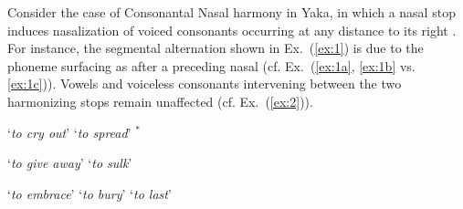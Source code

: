 \documentclass[11pt,a4paper]{article}
\begin{document}
%
%

Consider the case of Consonantal Nasal harmony in Yaka, in which a nasal stop induces nasalization of voiced consonants occurring at any distance to its right  \cite{hyman1995nasal,Walker_Yaka}.
For instance, the  segmental alternation shown in  Ex.~(\ref{ex:1}) is due to the phoneme  surfacing as  \textipa{[n]} after a preceding nasal  (cf.  Ex.~(\ref{ex:1a}, \ref{ex:1b} vs.  \ref{ex:1c})).\@
Vowels and voiceless consonants intervening between the two harmonizing stops remain unaffected  (cf. Ex.~(\ref{ex:2})).


\begin{exe}
    \ex\label{ex:1}\begin{xlist}
    	 \ex\label{ex:1a}    `\emph{to cry out}'
	 \ex\label{ex:1b}    `\emph{to spread}'
	 \ex\label{ex:1c} $^*$      
	\end{xlist}
    \ex\label{ex:2}\begin{xlist}
     	\ex\label{ex:2a} `\emph{to give away}'
    	\ex\label{ex:2b} `\emph{to sulk}'
    \end{xlist}
     \ex\label{ex:3}\begin{xlist}
    	 \ex\label{ex:3a}     `\emph{to embrace}'
	 \ex\label{ex:3b}   `\emph{to bury}'
	 \ex\label{ex:3c}   `\emph{to last}'
	\end{xlist}
\end{exe}
\end{document}
